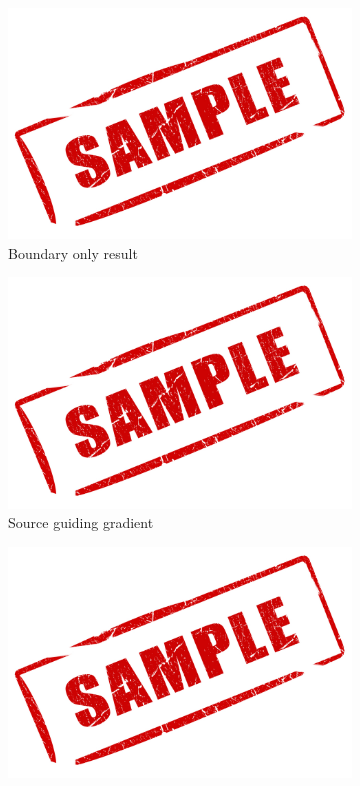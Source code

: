 \documentclass[paper=a4, fontsize=12pt]{scrartcl} %
\numberwithin{equation}{section}       %
\numberwithin{figure}{section}         %
\numberwithin{table}{section}          %
\begin{document}
\begin{figure}[H]
    \centering
    \begin{subfigure}[b]{0.45\textwidth}
        \includegraphics[width=\textwidth]{sample}
        \caption{ Boundary only result}
    \end{subfigure}
    \begin{subfigure}[b]{0.45\textwidth}
        \includegraphics[width=\textwidth]{sample}
        \caption{ Source guiding gradient}
    \end{subfigure}
    \begin{subfigure}[b]{0.80\textwidth}
        \includegraphics[width=\textwidth]{sample}

\end{subfigure}
\end{figure}
\end{document}
